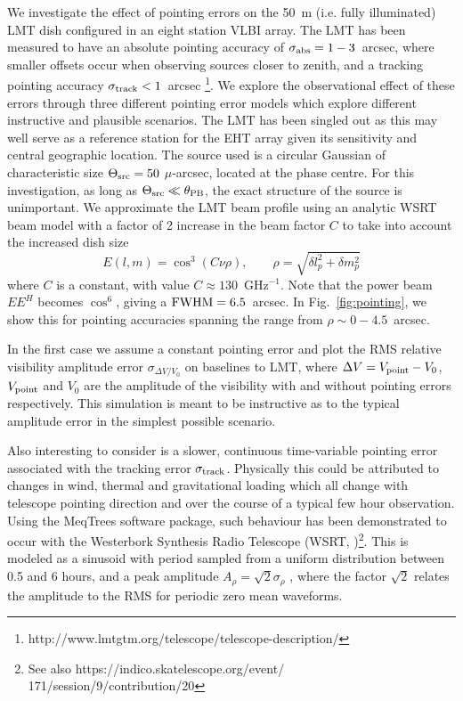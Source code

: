 
We investigate the effect of pointing errors on the 50~m (i.e. fully illuminated) LMT dish configured in an eight station VLBI array. The LMT has been measured to have an absolute pointing accuracy of $\sigma_{\rm abs} = 1-3$~arcsec, where smaller offsets occur when observing sources closer to zenith, and a tracking pointing accuracy $\sigma_{\rm track} < 1$~arcsec \footnote{http://www.lmtgtm.org/telescope/telescope-description/}. We explore the observational effect of these errors through three different pointing error models which explore different instructive and plausible scenarios. The LMT has been singled out as this may well serve as a reference station for the EHT array given its sensitivity and central geographic location. The source used is a circular Gaussian of characteristic size $\Theta_{\rm src}=50$ $\mu$-arcsec, located at the phase centre. For this investigation, as long as $\Theta_{\rm src} \ll \theta_{\rm PB}$, the exact structure of the source is unimportant. We approximate the LMT beam profile using an analytic WSRT beam model \citep{Popping_2008} with a factor of 2 increase in the beam factor $C$ to take into account the increased dish size
\begin{equation}
E(l, m) = \cos^3(C\nu \rho),\qquad   \rho = \sqrt{\delta l_p^2 + \delta m_p^2}
\end{equation}
where $C$ is a constant, with value $C \approx 130$~GHz$^{-1}$. Note that the power beam $EE^H$ becomes $\cos^6$, giving a $\rm{FWHM} = 6.5 $~arcsec. In Fig.~\ref{fig:pointing}, we show this for pointing accuracies spanning the range from $\rho \sim 0-4.5$~arcsec. 

In the first case we assume a constant pointing error and plot the RMS relative visibility amplitude error $\sigma_{\Delta V/V_0}$ on baselines to LMT, where $\Delta V = V_{\rm point} - V_{0}$, $V_{\rm point}$ and $V_{0}$ are the amplitude of the visibility with and without pointing errors respectively. This simulation is meant to be instructive as to the typical amplitude error in the simplest possible scenario.


Also interesting to consider is a slower, continuous time-variable pointing error associated with the tracking error $\sigma_{\rm track}$. Physically this could be attributed to changes in wind, thermal and gravitational loading which all change with telescope pointing direction and over the course of a typical few hour observation. Using the MeqTrees software package, such behaviour has been demonstrated to occur with the Westerbork Synthesis Radio Telescope (WSRT, \cite{Smirnov_2011c})\footnote{See also https://indico.skatelescope.org/event/\\171/session/9/contribution/20}. This is modeled as a sinusoid with period sampled from a uniform distribution between 0.5 and 6 hours, and a peak amplitude $A_{\rho} = \sqrt{2} \sigma_{\rho}$ , where the factor $\sqrt{2}$ relates the amplitude to the RMS for periodic zero mean waveforms. 


